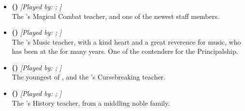\documentclass[blue]{GL2020}
\begin{document}
\subsubsection*{\pFarm{}}
\begin{itemize}
    \item \textbf{\cInterpol{\full} (\cInterpol{\MYcharpronouns})} \textit{[Played by: \cInterpol{\MYplayer}; \cInterpol{\MYplayerpronouns}]}\\ The \pSc{}'s Magical Combat teacher, and one of the newest staff members.
    
    \item \textbf{\cMusic{\full} (\cMusic{\MYcharpronouns})} \textit{[Played by: \cMusic{\MYplayer}; \cMusic{\MYplayerpronouns}]}\\ The \pSc{}'s Music teacher, with a kind heart and a great reverence for music, who has been at the \pSc{} for many years. One of the contenders for the Principalship.
    
    \item \textbf{\cPrince{\full} (\cPrince{\MYcharpronouns})} \textit{[Played by: \cPrince{\MYplayer}; \cPrince{\MYplayerpronouns}]}\\ The youngest \cPrince{\child} of \cQueen{\full}, and the \pSc{}'s Cursebreaking teacher.
   		 
    \item \textbf{\cHistory{\full} (\cHistory{\MYcharpronouns})} \textit{[Played by: \cHistory{\MYplayer}; \cHistory{\MYplayerpronouns}]}\\ The \pSc{}'s History teacher, from a middling noble family.
\end{itemize}
\end{document}
